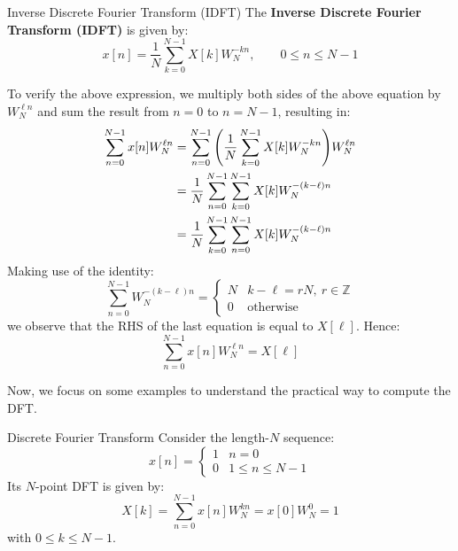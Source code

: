 \documentclass[../../main/main.tex]{subfiles}
\begin{document}
\begin{definition}{Inverse Discrete Fourier Transform (IDFT)}{}
    The \textbf{Inverse Discrete Fourier Transform (IDFT)} is given by:
    \begin{equation}
        x[n]
        =
        \frac{1}{N} \sum_{k=0}^{N-1} X[k] W_{N}^{-kn},
        \qquad
        0 \le n \le N-1
        \label{eq:L12_S08_1}
    \end{equation}
\end{definition}
To verify the above expression, we multiply both sides of the above equation by \( W_{N}^{\ell n} \) and sum the result from \( n=0 \) to \( n=N-1 \), resulting in:
\begin{align}
    \sum_{n=0}^{N-1} x[n] W_{N}^{\ell n}
    &=
        \sum_{n=0}^{N-1} \qty(\frac{1}{N} \sum_{k=0}^{N-1} X[k] W_{N}^{-kn}) W_{N}^{\ell n} \nonumber   \\
    &=
        \frac{1}{N} \sum_{n=0}^{N-1} \sum_{k=0}^{N-1} X[k] W_{N}^{-(k-\ell)n}   \nonumber   \\
    &=
        \frac{1}{N} \sum_{k=0}^{N-1} \sum_{n=0}^{N-1} X[k] W_{N}^{-(k-\ell)n}
\end{align}
Making use of the identity:
\begin{equation}
    \sum_{n=0}^{N-1} W_{N}^{-(k-\ell)n}
    =
    \begin{cases}
        N   &   k-\ell = rN, \ r \in \mathbb{Z} \\
        0   &   \text{otherwise}
    \end{cases}
    \label{eq:L12_S10_1}
\end{equation}
we observe that the RHS of the last equation is equal to \( X[\ell] \). Hence:
\begin{equation}
    \sum_{n=0}^{N-1} x[n] W_{N}^{\ell n}
    =
    X[\ell]
    \label{eq:L12_S10_2}
\end{equation}

Now, we focus on some examples to understand the practical way to compute the DFT.

\begin{example}{Discrete Fourier Transform}{}
    Consider the length-\( N \) sequence:
    \begin{equation}
        x[n]
        =
        \begin{cases}
            1   &   n=0 \\
            0   &   1 \le n \le N-1
        \end{cases}
        \label{eq:L12_S11_1}
    \end{equation}
    Its \( N \)-point DFT is given by:
    \begin{equation}
        X[k]
        =
        \sum_{n=0}^{N-1} x[n] W_{N}^{kn}
        =
        x[0] W_{N}^{0}
        =
        1
        \label{eq:L12_S11_2}
    \end{equation}
    with \( 0 \le k \le N-1 \).
\end{example}
\end{document}
